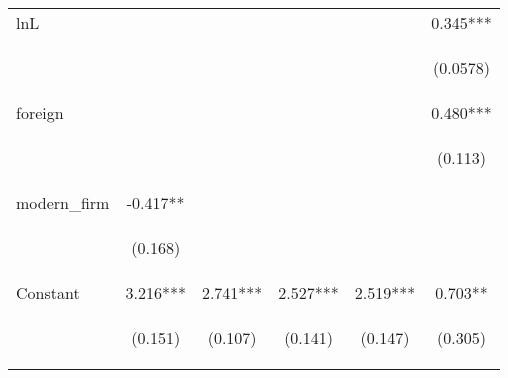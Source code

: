 \begin{center}
\begin{tabular}{lccccc}
lnL &  &  &  &  & 0.345*** \\
\vspace{4pt} & \begin{footnotesize}\end{footnotesize} & \begin{footnotesize}\end{footnotesize} & \begin{footnotesize}\end{footnotesize} & \begin{footnotesize}\end{footnotesize} & \begin{footnotesize}(0.0578)\end{footnotesize} \\
foreign &  &  &  &  & 0.480*** \\
\vspace{4pt} & \begin{footnotesize}\end{footnotesize} & \begin{footnotesize}\end{footnotesize} & \begin{footnotesize}\end{footnotesize} & \begin{footnotesize}\end{footnotesize} & \begin{footnotesize}(0.113)\end{footnotesize} \\
modern\_firm & -0.417** &  &  &  &  \\
\vspace{4pt} & \begin{footnotesize}(0.168)\end{footnotesize} & \begin{footnotesize}\end{footnotesize} & \begin{footnotesize}\end{footnotesize} & \begin{footnotesize}\end{footnotesize} & \begin{footnotesize}\end{footnotesize} \\
Constant & 3.216*** & 2.741*** & 2.527*** & 2.519*** & 0.703** \\
 & \begin{footnotesize}(0.151)\end{footnotesize} & \begin{footnotesize}(0.107)\end{footnotesize} & \begin{footnotesize}(0.141)\end{footnotesize} & \begin{footnotesize}(0.147)\end{footnotesize} & \begin{footnotesize}(0.305)\end{footnotesize} \\

\end{tabular}
\end{center}

